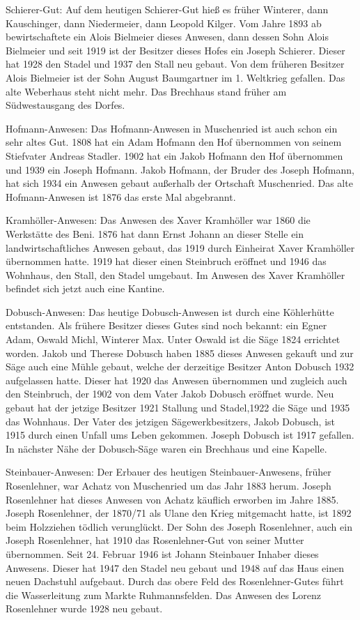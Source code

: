 \documentclass{book}
\begin{document}
Schierer-Gut: Auf dem heutigen Schierer-Gut hieß es früher Winterer, dann
Kauschinger, dann Niedermeier, dann Leopold Kilger. Vom Jahre 1893 ab
bewirtschaftete ein Alois Bielmeier dieses Anwesen, dann dessen Sohn Alois
Bielmeier und seit 1919 ist der Besitzer dieses Hofes ein Joseph Schierer.
Dieser hat 1928 den Stadel und 1937 den Stall neu gebaut. Von dem früheren
Besitzer Alois Bielmeier ist der Sohn August Baumgartner im 1. Weltkrieg
gefallen. Das alte Weberhaus steht nicht mehr. Das Brechhaus stand früher am
Südwestausgang des Dorfes.

Hofmann-Anwesen: Das Hofmann-Anwesen in Muschenried ist auch schon ein sehr
altes Gut. 1808 hat ein Adam Hofmann den Hof übernommen von seinem Stiefvater
Andreas Stadler. 1902 hat ein Jakob Hofmann den Hof übernommen und 1939 ein
Joseph Hofmann. Jakob Hofmann, der Bruder des Joseph Hofmann, hat sich 1934 ein
Anwesen gebaut außerhalb der Ortschaft Muschenried. Das alte Hofmann-Anwesen ist
1876 das erste Mal abgebrannt.

Kramhöller-Anwesen: Das Anwesen des Xaver Kramhöller war 1860 die Werkstätte des
Beni. 1876 hat dann Ernst Johann an dieser Stelle ein landwirtschaftliches
Anwesen gebaut, das 1919 durch Einheirat Xaver Kramhöller übernommen hatte. 1919
hat dieser einen Steinbruch eröffnet und 1946 das Wohnhaus, den Stall, den
Stadel umgebaut. Im Anwesen des Xaver Kramhöller befindet sich jetzt auch eine
Kantine.

Dobusch-Anwesen: Das heutige Dobusch-Anwesen ist durch eine Köhlerhütte
entstanden. Als frühere Besitzer dieses Gutes sind noch bekannt: ein Egner Adam,
Oswald Michl, Winterer Max. Unter Oswald ist die Säge 1824 errichtet worden.
Jakob und Therese Dobusch haben 1885 dieses Anwesen gekauft und zur Säge auch
eine Mühle gebaut, welche der derzeitige Besitzer Anton Dobusch 1932 aufgelassen
hatte. Dieser hat 1920 das Anwesen übernommen und zugleich auch den Steinbruch,
der 1902 von dem Vater Jakob Dobusch eröffnet wurde. Neu gebaut hat der jetzige
Besitzer 1921 Stallung und Stadel,1922 die Säge und 1935 das Wohnhaus. Der Vater
des jetzigen Sägewerkbesitzers, Jakob Dobusch, ist 1915 durch einen Unfall ums
Leben gekommen. Joseph Dobusch ist 1917 gefallen. In nächster Nähe der
Dobusch-Säge waren ein Brechhaus und eine Kapelle.

Steinbauer-Anwesen: Der Erbauer des heutigen Steinbauer-Anwesens, früher
Rosenlehner, war Achatz von Muschenried um das Jahr 1883 herum. Joseph
Rosenlehner hat dieses Anwesen von Achatz käuflich erworben im Jahre 1885.
Joseph Rosenlehner, der 1870/71 als Ulane den Krieg mitgemacht hatte, ist 1892
beim Holzziehen tödlich verunglückt. Der Sohn des Joseph Rosenlehner, auch ein
Joseph Rosenlehner, hat 1910 das Rosenlehner-Gut von seiner Mutter übernommen.
Seit 24. Februar 1946 ist Johann Steinbauer Inhaber dieses Anwesens. Dieser hat
1947 den Stadel neu gebaut und 1948 auf das Haus einen neuen Dachstuhl
aufgebaut. Durch das obere Feld des Rosenlehner-Gutes führt die Wasserleitung
zum Markte Ruhmannsfelden. Das Anwesen des Lorenz Rosenlehner wurde 1928 neu
gebaut.
\end{document}

